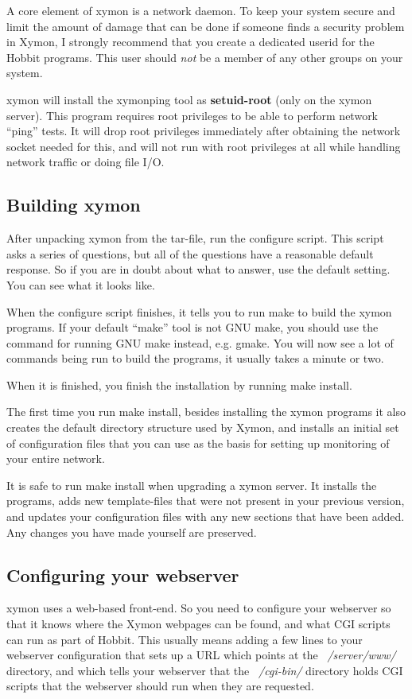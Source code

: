  A core element of xymon is a network daemon. To keep your system secure and limit the amount of damage that can be done if someone finds a security problem in Xymon, I strongly recommend that you create a dedicated userid for the Hobbit programs. This user should \emph{not}
 be a member of any other groups on your system.


 xymon will install the xymonping tool as \textbf{setuid-root}
(only on the xymon server). This program requires root privileges to be able to perform network ``ping'' tests. It will drop root privileges immediately after obtaining the network socket needed for this, and will not run with root privileges at all while handling network traffic or doing file I/O. 
\subsection{Building xymon}


 After unpacking xymon from the tar-file, run the configure script. This script asks a series of questions, but all of the questions have a reasonable default response. So if you are in doubt about what to answer, use the default setting. You can see what it looks like.


 When the configure script finishes, it tells you to run make to build the xymon programs. If your default ``make'' tool is not GNU make, you should use the command for running GNU make instead, e.g. gmake. You will now see a lot of commands being run to build the programs, it usually takes a minute or two.


 When it is finished, you finish the installation by running make install.


 The first time you run make install, besides installing the xymon programs it also creates the default directory structure used by Xymon, and installs an initial set of configuration files that you can use as the basis for setting up monitoring of your entire network.


 It is safe to run make install when upgrading a xymon server. It installs the programs, adds new template-files that were not present in your previous version, and updates your configuration files with any new sections that have been added. Any changes you have made yourself are preserved.
\subsection{Configuring your webserver}


 xymon uses a web-based front-end. So you need to configure your webserver so that it knows where the Xymon webpages can be found, and what CGI scripts can run as part of Hobbit. This usually means adding a few lines to your webserver configuration that sets up a URL which points at the \emph{~/server/www/}
 directory, and which tells your webserver that the \emph{~/cgi-bin/}
 directory holds CGI scripts that the webserver should run when they are requested.


